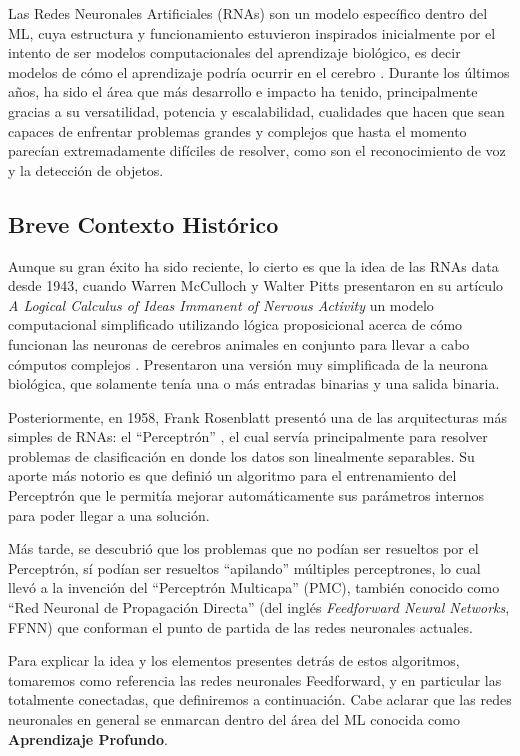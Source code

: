\documentclass[../../main.tex]{subfiles}
\begin{document}
Las Redes Neuronales Artificiales (RNAs) son un modelo específico dentro del ML, cuya
estructura y funcionamiento estuvieron inspirados inicialmente por el intento de ser
modelos computacionales del aprendizaje biológico, es decir modelos de cómo el aprendizaje
podría ocurrir en el cerebro \cite{deep-learning}. Durante los últimos años, ha sido el
área que más desarrollo e impacto ha tenido, principalmente gracias a su versatilidad,
potencia y escalabilidad, cualidades que hacen que sean capaces de enfrentar problemas
grandes y complejos \cite{hands-on-ML-sklearn-tf} que hasta el momento parecían
extremadamente difíciles de resolver, como son el reconocimiento de voz y la detección de
objetos.

\subsection{Breve Contexto Histórico}
Aunque su gran éxito ha sido reciente, lo cierto es que la idea de las RNAs data desde
1943, cuando Warren McCulloch y Walter Pitts presentaron en su artículo \textit{A Logical
Calculus of Ideas Immanent of Nervous Activity} \cite{mculloch-pitts-1943} un modelo
computacional simplificado utilizando lógica proposicional acerca de cómo funcionan las
neuronas de cerebros animales en conjunto para llevar a cabo cómputos complejos
\cite{hands-on-ML-sklearn-tf}. Presentaron una versión muy simplificada de la neurona
biológica, que solamente tenía una o más entradas binarias y una salida binaria.

Posteriormente, en 1958, Frank Rosenblatt presentó una de las arquitecturas más simples de
RNAs: el ``Perceptrón'' \cite{rosenblatt1958perceptron}, el cual servía principalmente
para resolver problemas de clasificación en donde los datos son linealmente separables. Su
aporte más notorio es que definió un algoritmo para el entrenamiento del Perceptrón que le
permitía mejorar automáticamente sus parámetros internos para poder llegar a una solución.

Más tarde, se descubrió que los problemas que no podían ser resueltos por el Perceptrón,
sí podían ser resueltos ``apilando'' múltiples perceptrones, lo cual llevó a la invención
del ``Perceptrón Multicapa'' (PMC), también conocido como ``Red Neuronal de Propagación
Directa'' (del inglés \textit{Feedforward Neural Networks}, FFNN) \cite{deep-learning} que
conforman el punto de partida de las redes neuronales actuales.

Para explicar la idea y los elementos presentes detrás de estos algoritmos, tomaremos como
referencia las redes neuronales Feedforward, y en particular las totalmente conectadas,
que definiremos a continuación. Cabe aclarar que las redes neuronales en general se
enmarcan dentro del área del ML conocida como \textbf{Aprendizaje Profundo}.
\end{document}
